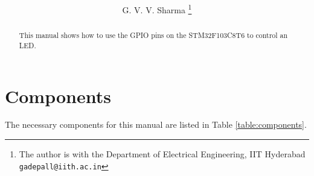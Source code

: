 \documentclass[journal,12pt,twocolumn]{IEEEtran}
\begin{document}

\def\putbox#1#2#3{\makebox[0in][l]{\makebox[#1][l]{}\raisebox{\baselineskip}[0in][0in]{\raisebox{#2}[0in][0in]{#3}}}}
     \def\rightbox#1{\makebox[0in][r]{#1}}
     \def\centbox#1{\makebox[0in]{#1}}
     \def\topbox#1{\raisebox{-\baselineskip}[0in][0in]{#1}}
     \def\midbox#1{\raisebox{-0.5\baselineskip}[0in][0in]{#1}}

\vspace{3cm}

\title{
}%
\author{G. V. V. Sharma%
\thanks{ The author is with the Department of Electrical Engineering, IIT Hyderabad
        {\tt\small gadepall@iith.ac.in}}%

}



\maketitle


\tableofcontents

\bigskip

\begin{abstract}
This manual shows how to use the GPIO pins on the STM32F103C8T6 to control an LED.
\end{abstract}
\section{Components}
The necessary components for this manual are listed in Table \ref{table:components}.
\begin{table}[!h]
\centering

\caption{}
\label{table:components}
\end{table}
%
\end{document}
